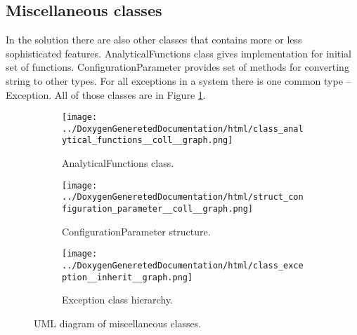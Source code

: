 	\subsection{Miscellaneous classes}
		In the solution there are also other classes that contains more or less sophisticated features. AnalyticalFunctions class gives implementation for initial set of functions. ConfigurationParameter provides set of methods for converting string to other types. For all exceptions in a system there is one common type -- Exception. All of those classes are in Figure \ref{fig:rest}.
		
		\begin{figure}[!hbtp]
		\begin{subfigure}[t]{0.5\textwidth}
			\centering
			\texttt{[image: ../DoxygenGeneretedDocumentation/html/class\_analytical\_functions\_\_coll\_\_graph.png]}
			\caption{AnalyticalFunctions class.}
		\end{subfigure}
		\begin{subfigure}[t]{0.5\textwidth}
			\centering
			\texttt{[image: ../DoxygenGeneretedDocumentation/html/struct\_configuration\_parameter\_\_coll\_\_graph.png]}
			\caption{ConfigurationParameter structure.}
		\end{subfigure}
	
		\begin{subfigure}[t]{\textwidth}
			\centering
			\texttt{[image: ../DoxygenGeneretedDocumentation/html/class\_exception\_\_inherit\_\_graph.png]}
			\caption{Exception class hierarchy.}
		\end{subfigure}
		\caption{UML diagram of miscellaneous classes.}
		\label{fig:rest}
	\end{figure}